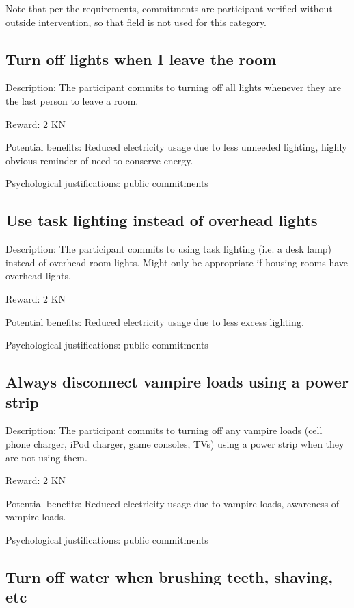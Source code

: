 Note that per the requirements, commitments are participant-verified without outside intervention, so that field is not used for this category.

\subsection{Turn off lights when I leave the room}

Description: The participant commits to turning off all lights whenever they are the last person to leave a room.

Reward: 2 KN

Potential benefits: Reduced electricity usage due to less unneeded lighting, highly obvious reminder of need to conserve energy.

Psychological justifications: public commitments

\subsection{Use task lighting instead of overhead lights}

Description: The participant commits to using task lighting (i.e. a desk lamp) instead of overhead room lights. Might only be appropriate if housing rooms have overhead lights.

Reward: 2 KN

Potential benefits: Reduced electricity usage due to less excess lighting.

Psychological justifications: public commitments

\subsection{Always disconnect vampire loads using a power strip}

Description: The participant commits to turning off any vampire loads (cell phone charger, iPod charger, game consoles, TVs) using a power strip when they are not using them.

Reward: 2 KN

Potential benefits: Reduced electricity usage due to vampire loads, awareness of vampire loads.

Psychological justifications: public commitments

\subsection{Turn off water when brushing teeth, shaving, etc}

